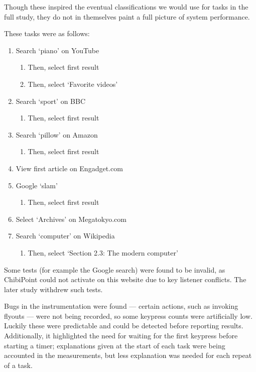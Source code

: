 \documentclass[a4paper, 12pt]{report}
\begin{document}
Though these inspired the eventual classifications we would use for tasks in the full study, they do not in themselves paint a full picture of system performance.

These tasks were as follows:

\begin{enumerate}
\item Search `piano' on YouTube
	\begin{enumerate}
        \item Then, select first result
        \item Then, select `Favorite videos'
    \end{enumerate}
	
\item Search `sport' on BBC
	\begin{enumerate}
		\item Then, select first result
	\end{enumerate}
	
\item Search `pillow' on Amazon
	\begin{enumerate}
		\item Then, select first result
	\end{enumerate}

\item View first article on Engadget.com

\item Google `slam'
	\begin{enumerate}
		\item Then, select first result
	\end{enumerate}

\item Select `Archives' on Megatokyo.com

\item Search `computer' on Wikipedia
	\begin{enumerate}
		\item Then, select `Section 2.3: The modern computer'
	\end{enumerate}
\end{enumerate}

Some tests (for example the Google search) were found to be invalid, as ChibiPoint could not activate on this website due to key listener conflicts. The later study withdrew such tests.

Bugs in the instrumentation were found --- certain actions, such as invoking flyouts --- were not being recorded, so some keypress counts were artificially low. Luckily these were predictable and could be detected before reporting results. Additionally, it highlighted the need for waiting for the first keypress before starting a timer; explanations given at the start of each task were being accounted in the measurements, but less explanation was needed for each repeat of a task.
\end{document}
